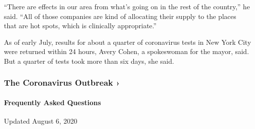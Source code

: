 ``There are effects in our area from what's going on in the rest of the
country,'' he said. ``All of those companies are kind of allocating
their supply to the places that are hot spots, which is clinically
appropriate.''

As of early July, results for about a quarter of coronavirus tests in
New York City were returned within 24 hours, Avery Cohen, a spokeswoman
for the mayor, said. But a quarter of tests took more than six days, she
said.

\href{https://www.nytimes.com/news-event/coronavirus?action=click\&pgtype=Article\&state=default\&region=MAIN_CONTENT_3\&context=storylines_faq}{}

\hypertarget{the-coronavirus-outbreak-}{%
\subsubsection{The Coronavirus Outbreak
›}\label{the-coronavirus-outbreak-}}

\hypertarget{frequently-asked-questions}{%
\paragraph{Frequently Asked
Questions}\label{frequently-asked-questions}}

Updated August 6, 2020

